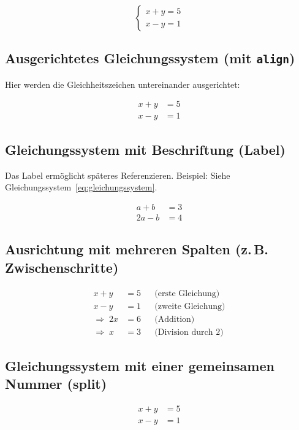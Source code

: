 \documentclass[twoside]{scrreprt}
\begin{document}
\[
\begin{cases}
x + y = 5 \\
x - y = 1
\end{cases}
\]

\subsection{Ausgerichtetes Gleichungssystem (mit \texttt{align})}

Hier werden die Gleichheitszeichen untereinander ausgerichtet:

\begin{align}
x + y &= 5 \\
x - y &= 1
\end{align}

\subsection{Gleichungssystem mit Beschriftung (Label)}

\noindent Das Label ermöglicht späteres Referenzieren.  
\noindent Beispiel: Siehe Gleichungssystem~\eqref{eq:gleichungssystem}.

\begin{align}
a + b &= 3 \\
2a - b &= 4
\label{eq:gleichungssystem}
\end{align}

\subsection{Ausrichtung mit mehreren Spalten (z.\,B. Zwischenschritte)}

\begin{align*}
x + y &= 5  && \text{(erste Gleichung)}\\
x - y &= 1  && \text{(zweite Gleichung)}\\
\Rightarrow\; 2x &= 6 && \text{(Addition)}\\
\Rightarrow\; x &= 3 && \text{(Division durch 2)}
\end{align*}

\subsection{Gleichungssystem mit einer gemeinsamen Nummer (split)}

\begin{equation}
\label{eq:split-system}
\begin{split}
x + y &= 5 \\
x - y &= 1
\end{split}
\end{equation}
\end{document}
